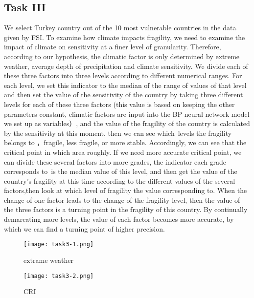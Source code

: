 \documentclass{mcmthesis}
\begin{document}
\subsection{Task III}
We select Turkey country out of the 10 most vulnerable countries 
in the data given by FSI. To examine how climate impacts fragility, 
we need to examine the impact of climate on sensitivity at a finer 
level of granularity. Therefore, according to our hypothesis, the 
climatic factor is only determined by extreme weather, average depth 
of precipitation and climate sensitivity. We divide each of these 
three factors into three levels according to different numerical 
ranges. For each level, we set this indicator to the median of the 
range of values ​​of that level and then set the value of the 
sensitivity of the country by taking three different levels 
for each of these three factors (this value is based on keeping 
the other parameters constant, climatic factors are input into the 
BP neural network model we set up as variables）, and the value of 
the fragility of the country is calculated by the sensitivity 
at this moment, then we can see which levels the fragility belongs 
to ，fragile, less fragile, or more stable. Accordingly, we can see 
that the critical point in which area roughly. If we need more accurate 
critical point, we can divide these several factors into more grades, 
the indicator each grade corresponds to is the median value of this 
level, and then get the value of the country's fragility at this 
time according to the different values of the several factors,then 
look at which level of fragility the value corresponding to. 
When the change of one factor leads to the change of the fragility 
level, then the value of the three factors is a turning point in the 
fragility of this country. By continually demarcating more levels, the 
value of each factor becomes more accurate, by which we can find a 
turning point of higher precision.
\begin{figure}[h]
  \begin{minipage}[h]{0.48\textwidth}
  \flushleft
  \texttt{[image: task3-1.png]}
  \caption{extrame weather}
  \end{minipage}
  \begin{minipage}[h]{0.48\textwidth}
  \flushright
  \texttt{[image: task3-2.png]}
  \caption{CRI}
  \end{minipage}
\end{figure}
\newpage
\end{document}
